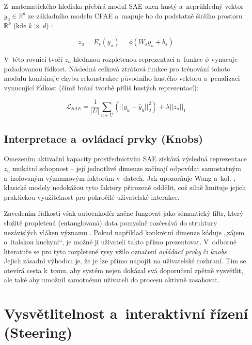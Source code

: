 Z~matematického hlediska přebírá modul SAE onen hustý a~neprůhledný vektor $y_u \in \mathbb{R}^d$ ze základního modelu CFAE a~mapuje ho do podstatně širšího prostoru $\mathbb{R}^k$ (kde $k \gg d$) \cite{Spisak2024}:

\begin{equation}
z_u = E_s(y_u) = \phi(W_s y_u + b_s)
\end{equation}

V~této rovnici tvoří $z_u$ hledanou rozpletenou reprezentaci a~funkce $\phi$ vynucuje požadovanou řídkost. Následná celková ztrátová funkce pro trénování tohoto modulu kombinuje chybu rekonstrukce původního hustého vektoru a~penalizaci vynucující řídkost (čímž brání tvorbě příliš hustých reprezentací):

\begin{equation}
\mathcal{L}_{SAE} = \frac{1}{|U|} \sum_{u \in U} \left( ||y_u - \hat{y}_u||_2^2 \right) + \lambda ||z_u||_1
\end{equation}

\subsection{Interpretace a~ovládací prvky (Knobs)}
\label{subsec:interpretace_knobs}

Omezením aktivační kapacity prostřednictvím SAE získává výsledná reprezentace $z_u$ unikátní schopnost -- její jednotlivé dimenze začínají odpovídat samostatným a~izolovaným významovým faktorům v~datech. Jak upozorňuje Wang a~kol. \cite{Wang2021}, klasické modely nedokážou tyto faktory přirozeně oddělit, což silně limituje jejich praktickou využitelnost pro pokročilé uživatelské interakce.

Zavedením řídkosti však autoenkodér začne fungovat jako sémantický filtr, který složitě propletená (entanglovaná) data pomyslně rozčesává do struktury nezávislých vláken významu \cite{Spisak2024}. Pokud například konkrétní dimenze kóduje „zájem o~italskou kuchyni“, je možné ji uživateli takto přímo prezentovat. V~odborné literatuře se pro tyto rozpletené rysy vžilo označení \textit{ovládací prvky} či \textit{knobs} \cite{Spisak2024, ONeill2024}. Jejich zásadní výhodou je, že je lze přímo napojit na uživatelské rozhraní. Tím se otevírá cesta k~tomu, aby systém nejen dokázal svá doporučení zpětně vysvětlit, ale také aby umožnil samotnému uživateli do procesu aktivně zasahovat.

\section{Vysvětlitelnost a~interaktivní řízení (Steering)}
\label{sec:vysvetlitelnost_steering}

